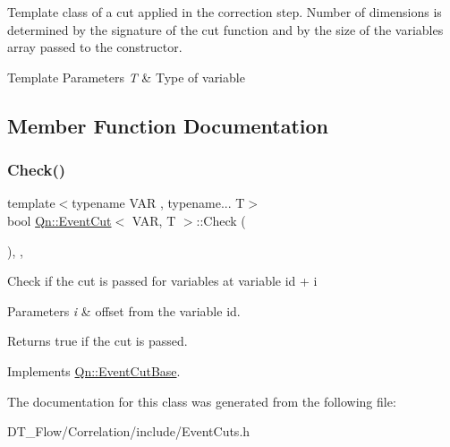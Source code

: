 Template class of a cut applied in the correction step. Number of dimensions is determined by the signature of the cut function and by the size of the variables array passed to the constructor. 
\begin{DoxyTemplParams}{Template Parameters}
{\em T} & Type of variable \\
\hline
\end{DoxyTemplParams}


\subsection{Member Function Documentation}
\mbox{\label{classQn_1_1EventCut_ab559f2c200401108566c1641773d778e}} 
\subsubsection{\texorpdfstring{Check()}{Check()}}
{\footnotesize\ttfamily template$<$typename V\+AR , typename... T$>$ \\
bool \mbox{\hyperlink{classQn_1_1EventCut}{Qn\+::\+Event\+Cut}}$<$ V\+AR, T $>$\+::Check (\begin{DoxyParamCaption}{ }\end{DoxyParamCaption})\hspace{0.3cm}{\ttfamily [inline]}, {\ttfamily [override]}, {\ttfamily [virtual]}}

Check if the cut is passed for variables at variable id + i 
\begin{DoxyParams}{Parameters}
{\em i} & offset from the variable id. \\
\hline
\end{DoxyParams}
\begin{DoxyReturn}{Returns}
true if the cut is passed. 
\end{DoxyReturn}


Implements \mbox{\hyperlink{structQn_1_1EventCutBase}{Qn\+::\+Event\+Cut\+Base}}.



The documentation for this class was generated from the following file\+:\begin{DoxyCompactItemize}
\item 
D\+T\+\_\+\+Flow/\+Correlation/include/Event\+Cuts.\+h\end{DoxyCompactItemize}
